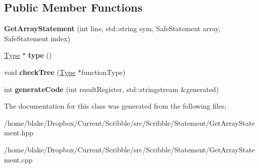 \subsection*{Public Member Functions}
\begin{DoxyCompactItemize}
\item 
\hypertarget{class_scribble_core_1_1_get_array_statement_aab7ddecc527fa8a2f6bff2b0a6354459}{{\bfseries Get\-Array\-Statement} (int line, std\-::string sym, Safe\-Statement array, Safe\-Statement index)}\label{class_scribble_core_1_1_get_array_statement_aab7ddecc527fa8a2f6bff2b0a6354459}

\item 
\hypertarget{class_scribble_core_1_1_get_array_statement_a3aeddab53d3243cd50d58f233f773578}{\hyperlink{class_scribble_core_1_1_type}{Type} $\ast$ {\bfseries type} ()}\label{class_scribble_core_1_1_get_array_statement_a3aeddab53d3243cd50d58f233f773578}

\item 
\hypertarget{class_scribble_core_1_1_get_array_statement_af43c3592ddafac3d5a73d7c0cd3684a2}{void {\bfseries check\-Tree} (\hyperlink{class_scribble_core_1_1_type}{Type} $\ast$function\-Type)}\label{class_scribble_core_1_1_get_array_statement_af43c3592ddafac3d5a73d7c0cd3684a2}

\item 
\hypertarget{class_scribble_core_1_1_get_array_statement_a7cc5ada009b6b5264e1809dece0fc315}{int {\bfseries generate\-Code} (int result\-Register, std\-::stringstream \&generated)}\label{class_scribble_core_1_1_get_array_statement_a7cc5ada009b6b5264e1809dece0fc315}

\end{DoxyCompactItemize}


The documentation for this class was generated from the following files\-:\begin{DoxyCompactItemize}
\item 
/home/blake/\-Dropbox/\-Current/\-Scribble/src/\-Scribble/\-Statement/Get\-Array\-Statement.\-hpp\item 
/home/blake/\-Dropbox/\-Current/\-Scribble/src/\-Scribble/\-Statement/Get\-Array\-Statement.\-cpp\end{DoxyCompactItemize}
